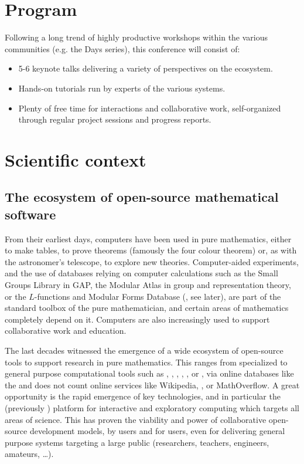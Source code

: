 \documentclass[12pt]{amsart}
\begin{document}
\section{Program}

Following a long trend of highly productive workshops within the
various communities (e.g. the \Sage Days series), this conference will consist of:
\begin{itemize}
\item 5-6 keynote talks delivering a variety of perspectives on the
  ecosystem.
\item Hands-on tutorials run by experts of the various systems.
\item Plenty of free time for interactions and collaborative work,
  self-organized through regular project sessions and progress
  reports.
\end{itemize}

\section{Scientific context}

\subsection{The ecosystem of open-source mathematical software}

From their earliest days, computers have been used in pure
mathematics, either to make tables, to prove theorems (famously the
four colour theorem) or, as with the astronomer's telescope, to
explore new theories. Computer-aided experiments, and the use of
databases relying on computer calculations such as the Small Groups
Library in GAP, the Modular Atlas in group and representation theory,
or the $L$-functions and Modular Forms Database (\LMFDB, see later),
are part of the standard toolbox of the pure mathematician, and
certain areas of mathematics completely depend on it. Computers are
also increasingly used to support collaborative work and education.

The last decades witnessed the emergence of a wide ecosystem of
open-source tools to support research in pure mathematics. This ranges
from specialized to general purpose computational tools such as \GAP,
\PariGP, \Linbox, \MPIR, \Sage, or \Singular, via online databases
like the \LMFDB and does not count online services like Wikipedia,
\Arxiv, or MathOverflow. A great opportunity is the rapid emergence of
key technologies, and in particular the \Jupyter (previously \IPython)
platform for interactive and exploratory computing which targets all
areas of science. This has proven the viability and power of
collaborative open-source development models, by users and for users,
even for delivering general purpose systems targeting a large public
(researchers, teachers, engineers, amateurs, \ldots).
\end{document}
